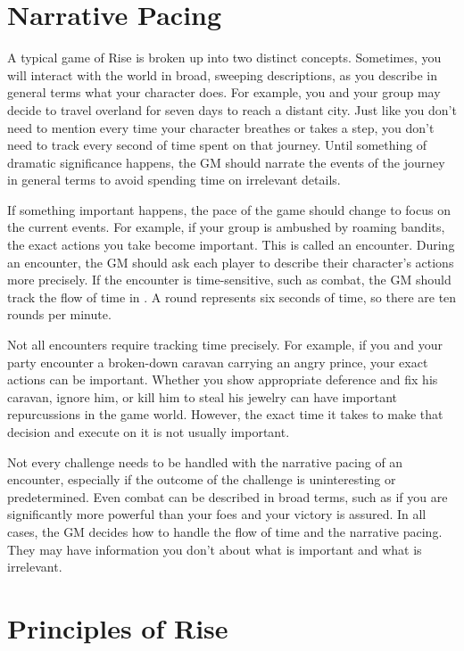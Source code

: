 \section{Narrative Pacing}
    A typical game of Rise is broken up into two distinct concepts.
    Sometimes, you will interact with the world in broad, sweeping descriptions, as you describe in general terms what your character does.
    For example, you and your group may decide to travel overland for seven days to reach a distant city.
    Just like you don't need to mention every time your character breathes or takes a step, you don't need to track every second of time spent on that journey.
    Until something of dramatic significance happens, the GM should narrate the events of the journey in general terms to avoid spending time on irrelevant details.

    If something important happens, the pace of the game should change to focus on the current events.
    For example, if your group is ambushed by roaming bandits, the exact actions you take become important.
    This is called an encounter.
    During an encounter, the GM should ask each player to describe their character's actions more precisely.
    If the encounter is time-sensitive, such as combat, the GM should track the flow of time in .
    A round represents six seconds of time, so there are ten rounds per minute.

    Not all encounters require tracking time precisely.
    For example, if you and your party encounter a broken-down caravan carrying an angry prince, your exact actions can be important.
    Whether you show appropriate deference and fix his caravan, ignore him, or kill him to steal his jewelry can have important repurcussions in the game world.
    However, the exact time it takes to make that decision and execute on it is not usually important.

    Not every challenge needs to be handled with the narrative pacing of an encounter, especially if the outcome of the challenge is uninteresting or predetermined.
    Even combat can be described in broad terms, such as if you are significantly more powerful than your foes and your victory is assured.
    In all cases, the GM decides how to handle the flow of time and the narrative pacing.
    They may have information you don't about what is important and what is irrelevant.

\section{Principles of Rise}

